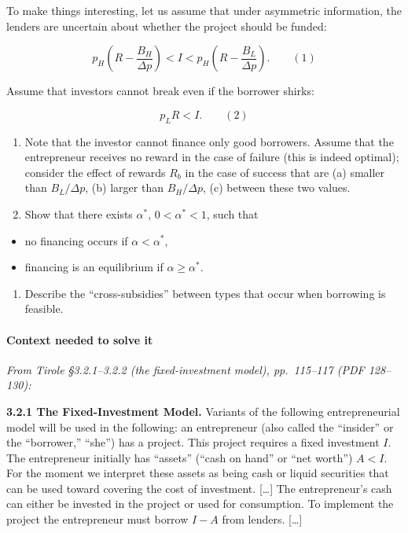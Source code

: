 \documentclass[11pt,a4paper]{article}
\providecommand{\tightlist}{\setlength{\itemsep}{0pt}\setlength{\parskip}{0pt}}
\begin{document}
To make things interesting, let us assume that under asymmetric information, the lenders are
uncertain about whether the project should be funded:

\[p_H\left(R - \frac{B_H}{\Delta p}\right) < I < p_H\left(R - \frac{B_L}{\Delta p}\right). \qquad (1)\]

Assume that investors cannot break even if the borrower shirks:

\[p_L R < I. \qquad (2)\]

\begin{enumerate}
\def\labelenumi{(\roman{enumi})}
\item
  Note that the investor cannot finance only good borrowers. Assume that the entrepreneur receives
  no reward in the case of failure (this is indeed optimal); consider the effect of rewards \(R_b\)
  in the case of success that are (a) smaller than \(B_L/\Delta p\), (b) larger than
  \(B_H/\Delta p\), (c) between these two values.
\item
  Show that there exists \(\alpha^*\), \(0 < \alpha^* < 1\), such that
\end{enumerate}

\begin{itemize}
\tightlist
\item
  no financing occurs if \(\alpha < \alpha^*\),
\item
  financing is an equilibrium if \(\alpha \geqslant \alpha^*\).
\end{itemize}

\begin{enumerate}
\def\labelenumi{(\roman{enumi})}
\setcounter{enumi}{2}
\tightlist
\item
  Describe the ``cross-subsidies'' between types that occur when borrowing is feasible.
\end{enumerate}

\paragraph{Context needed to solve it}

\emph{From Tirole §3.2.1--3.2.2 (the fixed-investment model), pp.~115--117 (PDF 128--130):}

\textbf{3.2.1 The Fixed-Investment Model.} Variants of the following entrepreneurial model will be
used in the following: an entrepreneur (also called the ``insider'' or the ``borrower,'' ``she'')
has a project. This project requires a fixed investment \(I\). The entrepreneur initially has
``assets'' (``cash on hand'' or ``net worth'') \(A < I\). For the moment we interpret these assets
as being cash or liquid securities that can be used toward covering the cost of investment.
{[}\ldots{]} The entrepreneur's cash can either be invested in the project or used for consumption.
To implement the project the entrepreneur must borrow \(I - A\) from lenders. {[}\ldots{]}
\end{document}

